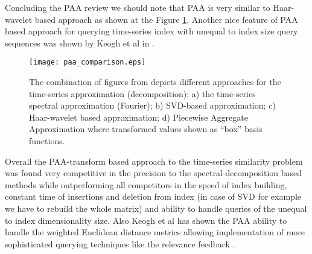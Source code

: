 Concluding the PAA review we should note that PAA is very similar to Haar-wavelet based approach \cite{citeulike:4384535} as shown at the Figure \ref{fig:paa_comparison}. Another nice feature of PAA based approach for querying time-series index with unequal to index size query sequences was shown by Keogh et al in \cite{citeulike:3000416}.
\begin{figure}[tbp]
   \centering
   \texttt{[image: paa\_comparison.eps]}
   \caption{The combination of figures from \cite{citeulike:3000416} depicts different approaches for the time-series approximation (decomposition): a) the time-series spectral approximation (Fourier); b) SVD-based approximation; c) Haar-wavelet based approximation; d) Piecewise Aggregate Approximation where transformed values shown as ``box'' basis functions.}
   \label{fig:paa_comparison}
\end{figure} 

Overall the PAA-transform based approach to the time-series similarity problem was found very competitive in the precision to the spectral-decomposition based methods while outperforming all competitors in the speed of index building, constant time of insertions and deletion from index (in case of SVD for example we have to rebuild the whole matrix) and ability to handle queries of the unequal to index dimensionality size. Also Keogh et al has shown the PAA ability to handle the weighted Euclidean distance metrics allowing implementation of more sophisticated querying techniques like the relevance feedback \cite{citeulike:4406444}.
